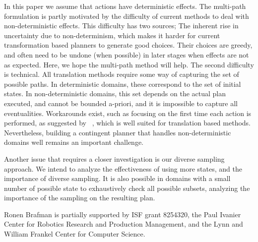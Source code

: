 \documentclass[letterpaper]{article}
\numberwithin{equation}{section}	%
\begin{document}
In this paper we assume that actions have deterministic effects. The multi-path formulation is partly motivated by the difficulty of current methods to deal with non-deterministic effects. This difficulty has two sources; The inherent rise in uncertainty due to non-determinism, which makes it harder for current transformation based planners to generate good choices. Their choices are greedy, and often need to be undone (when possible) in later stages when effects are not as expected. Here, we hope the multi-path method will help. The second difficulty is technical. All translation methods require some way of capturing the set of possible paths. In deterministic domains, these correspond to the set of initial states. In non-deterministic domains, this set depends on the actual plan executed, and cannot be bounded a-priori, and it is impossible to capture all eventualities. Workarounds exist, such as focusing on the first time each action is performed, as suggested by ~\citet{PalaciosG09}, which is well suited for translation based methods. Nevertheless, building a contingent planner that handles non-deterministic domains well remains an important challenge.

Another issue that requires a closer investigation is our diverse sampling approach. We intend to analyze the effectiveness of using more states, and the importance of diverse sampling. It is also possible in domains with a small number of possible state to exhaustively check all possible subsets, analyzing the importance of the sampling on the resulting plan.


 Ronen Brafman is partially supported by ISF grant 8254320, the Paul Ivanier Center for Robotics Research and Production Management, and the Lynn and William Frankel Center for Computer Science.
\end{document}
